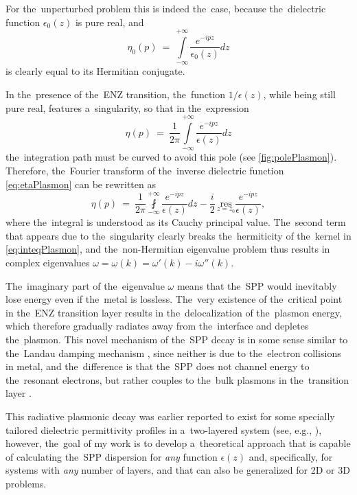For the~unperturbed problem this is indeed the~case, because the~dielectric function $\epsilon_0(z)$ is pure real, and 
\begin{equation}
\eta_0(p)~=~\int\limits_{-\infty}^{+\infty}\frac{e^{-ipz}}{\epsilon_0(z)}dz
\end{equation}
is clearly equal to its Hermitian conjugate.

In the~presence of the~ENZ transition, the~function $1/\epsilon(z)$, while being still pure real, features a~singularity, so that in the~expression 
\begin{equation}
\label{eq:etaPlasmon}
\eta(p)~=~\dfrac{1}{2\pi} \int\limits_{-\infty}^{+\infty} \frac{e^{-ipz}}{\epsilon(z)}dz
\end{equation}
the~integration path must be curved to avoid this pole (see \cref{fig:polePlasmon}).
Therefore, the~Fourier transform of the~inverse dielectric function \cref{eq:etaPlasmon} can be rewritten as
\begin{equation}
\eta(p)~=~\dfrac{1}{2\pi} \fint\limits_{-\infty}^{+\infty} \frac{e^{-ipz}}{\epsilon(z)}dz - \frac{i}{2}\,\underset{z=z_0}{\mathrm{res}}\frac{e^{-ipz}}{\epsilon(z)},
\end{equation}
where the~integral is understood as its Cauchy principal value.
The~second term that appears due to the~singularity clearly breaks the~hermiticity of the~kernel in \cref{eq:inteqPlasmon}, and the~non-Hermitian eigenvalue problem thus results in complex eigenvalues $\omega = \omega(k) = \omega'(k) - i\omega''(k)$.

The~imaginary part of the~eigenvalue $\omega$ means that the~SPP would inevitably lose energy even if the~metal is lossless.
The~very existence of the~critical point in the~ENZ transition layer results in the~delocalization of the~plasmon energy, which therefore gradually radiates away from the~interface and depletes the~plasmon.
This novel mechanism of the~SPP decay is in some sense similar to the~Landau damping mechanism \cite{LLtom8}, since neither is due to the~electron collisions in metal, and the~difference is that the~SPP does not channel energy to the~resonant electrons, but rather couples to the~bulk plasmons in the~transition layer \cite{akimov}.

This radiative plasmonic decay was earlier reported to exist for some specially tailored dielectric permittivity profiles in a~two-layered system (see, e.g., \cite{akimov}), however, the~goal of my work is to develop a~theoretical approach that is capable of calculating the~SPP dispersion for \textit{any} function $\epsilon(z)$ and, specifically, for systems with \textit{any} number of layers, and that can also be generalized for 2D or 3D problems.

